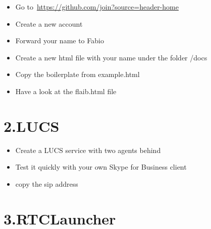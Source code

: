 \documentclass{article}
\begin{document}
\begin{itemize}[noitemsep,topsep=\mdcompacttopsep]%

\item{}Go to~\href{https://github.com/join?source=header-home}{https://github.com/join?source=header-home}%

\item{}Create a new account%

\item{}Forward your name to Fabio%

\item{}Create a new html file with your name under the folder /docs%

\item{}Copy the boilerplate from example.html%

\item{}Have a look at the flaib.html file%
\end{itemize}%

\section{2.\hspace*{0.5em}LUCS}\label{sec-lucs}%

\begin{itemize}[noitemsep,topsep=\mdcompacttopsep]%

\item{}Create a LUCS service with two agents behind%

\item{}Test it quickly with your own Skype for Business client%

\item{}copy the sip address%
\end{itemize}%

\section{3.\hspace*{0.5em}RTCLauncher}\label{sec-rtclauncher}%
\end{document}
